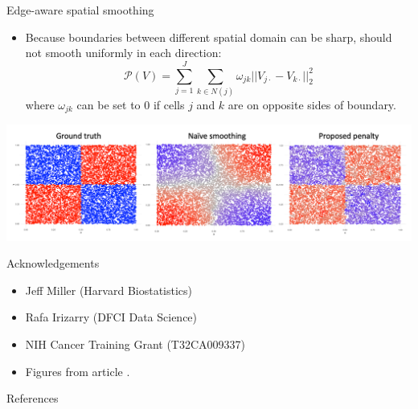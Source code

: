 \documentclass[aspectratio=43]{beamer}
\begin{document}
\begin{frame}{Edge-aware spatial smoothing}
\begin{itemize}
\item { 
Because boundaries between different spatial domain can be sharp, should not smooth uniformly in each direction:
\begin{equation*}
\mathcal{P}(V) = \sum_{j=1}^J \sum_{k \in N(j)} \omega_{jk} || V_{j \cdot} - V_{k \cdot} ||_2^2
\end{equation*}
where $\omega_{jk}$ can be set to $0$ if cells $j$ and $k$ are on opposite sides of boundary.

}
\end{itemize}


\centering
\includegraphics[scale=0.15]{Fig/edge_aware.png}
\end{frame}

\begin{frame}{Acknowledgements}
\begin{itemize}
\item Jeff Miller (Harvard Biostatistics)
\item Rafa Irizarry (DFCI Data Science)
\item NIH Cancer Training Grant (T32CA009337) 
\item Figures from article \cite{nicol2023model}.
\end{itemize}
\end{frame}

\begin{frame}{References}

\end{frame}
\end{document}
